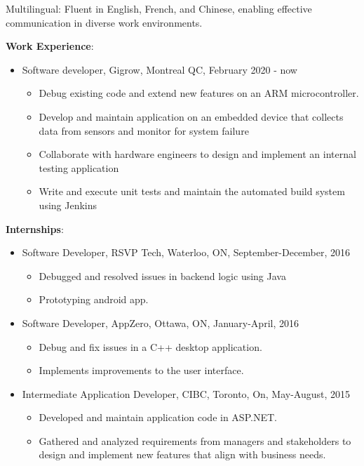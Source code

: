 \documentclass[letterpaper]{article}
\begin{document}
Multilingual: Fluent in English, French, and Chinese, enabling effective communication in diverse work environments.\\



\begin{large}
\textbf{Work Experience}:
\end{large}
\begin{itemize}[leftmargin=5.5mm]
\item Software developer, Gigrow, Montreal QC, February 2020 - now
	\begin{itemize} 
	\item Debug existing code and extend new features on an ARM microcontroller. 
	\item Develop and maintain application on an embedded device that collects data from sensors and monitor for system failure
	\item Collaborate with hardware engineers to design and implement an internal testing application 
	\item Write and execute unit tests and maintain the automated build system using Jenkins
	\end{itemize}
\end{itemize}

\begin{large}
\textbf{Internships}:
\end{large}
\begin{itemize}[leftmargin=*]
\item Software Developer,  RSVP Tech, Waterloo, ON, September-December, 2016
	\begin{itemize}
     \item Debugged and resolved issues in backend logic using Java
     \item Prototyping android app.
     \end{itemize}
\item Software Developer,  AppZero, Ottawa, ON, January-April, 2016
	\begin{itemize}
	\item Debug and fix issues in a C++ desktop application.
	\item Implements improvements to the user interface.
	\end{itemize}
\item Intermediate Application Developer, CIBC, Toronto, On, May-August, 2015 
\begin{itemize}
    \item Developed and maintain application code in ASP.NET.
 	\item Gathered and analyzed requirements from managers and stakeholders to design and implement new features that align with business needs.
    \end{itemize}

\end{itemize}
\end{document}
